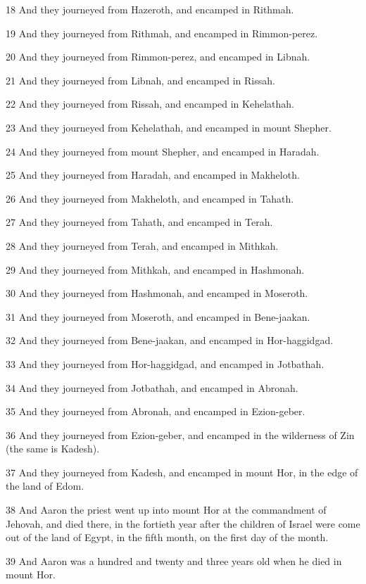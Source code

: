 \par 18 And they journeyed from Hazeroth, and encamped in Rithmah.
\par 19 And they journeyed from Rithmah, and encamped in Rimmon-perez.
\par 20 And they journeyed from Rimmon-perez, and encamped in Libnah.
\par 21 And they journeyed from Libnah, and encamped in Rissah.
\par 22 And they journeyed from Rissah, and encamped in Kehelathah.
\par 23 And they journeyed from Kehelathah, and encamped in mount Shepher.
\par 24 And they journeyed from mount Shepher, and encamped in Haradah.
\par 25 And they journeyed from Haradah, and encamped in Makheloth.
\par 26 And they journeyed from Makheloth, and encamped in Tahath.
\par 27 And they journeyed from Tahath, and encamped in Terah.
\par 28 And they journeyed from Terah, and encamped in Mithkah.
\par 29 And they journeyed from Mithkah, and encamped in Hashmonah.
\par 30 And they journeyed from Hashmonah, and encamped in Moseroth.
\par 31 And they journeyed from Moseroth, and encamped in Bene-jaakan.
\par 32 And they journeyed from Bene-jaakan, and encamped in Hor-haggidgad.
\par 33 And they journeyed from Hor-haggidgad, and encamped in Jotbathah.
\par 34 And they journeyed from Jotbathah, and encamped in Abronah.
\par 35 And they journeyed from Abronah, and encamped in Ezion-geber.
\par 36 And they journeyed from Ezion-geber, and encamped in the wilderness of Zin (the same is Kadesh).
\par 37 And they journeyed from Kadesh, and encamped in mount Hor, in the edge of the land of Edom.
\par 38 And Aaron the priest went up into mount Hor at the commandment of Jehovah, and died there, in the fortieth year after the children of Israel were come out of the land of Egypt, in the fifth month, on the first day of the month.
\par 39 And Aaron was a hundred and twenty and three years old when he died in mount Hor.
